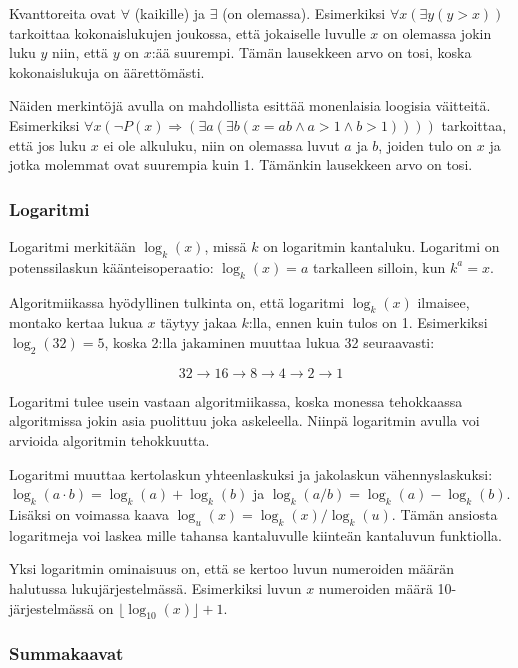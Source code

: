 Kvanttoreita ovat $\forall$ (kaikille) ja $\exists$
(on olemassa).
Esimerkiksi $\forall x (\exists y (y > x))$
tarkoittaa kokonaislukujen joukossa,
että jokaiselle luvulle $x$ on olemassa
jokin luku $y$ niin, että $y$ on $x$:ää suurempi.
Tämän lausekkeen arvo on tosi, koska kokonaislukuja
on äärettömästi.

Näiden merkintöjä avulla on mahdollista esittää
monenlaisia loogisia väitteitä.
Esimerkiksi
$\forall x (\lnot P(x) \Rightarrow (\exists a (\exists b (x = ab \land a > 1 \land b > 1))))$
tarkoittaa, että jos luku $x$ ei ole alkuluku,
niin on olemassa luvut $a$ ja $b$,
joiden tulo on $x$ ja jotka molemmat ovat suurempia kuin 1.
Tämänkin lausekkeen arvo on tosi.

\subsubsection{Logaritmi}


Logaritmi merkitään $\log_k(x)$, missä $k$ on logaritmin kantaluku.
Logaritmi on potenssilaskun käänteisoperaatio:
$\log_k(x)=a$ tarkalleen silloin, kun $k^a=x$.

Algoritmiikassa hyödyllinen tulkinta on,
että logaritmi $\log_k(x)$ ilmaisee, montako kertaa lukua $x$
täytyy jakaa $k$:lla, ennen kuin tulos on 1.
Esimerkiksi $\log_2(32)=5$, koska 2:lla jakaminen
muuttaa lukua 32 seuraavasti:

\[32 \rightarrow 16 \rightarrow 8 \rightarrow 4 \rightarrow 2 \rightarrow 1 \]

Logaritmi tulee usein vastaan algoritmiikassa,
koska monessa tehokkaassa algoritmissa jokin asia puolittuu
joka askeleella.
Niinpä logaritmin avulla voi arvioida algoritmin tehokkuutta.

Logaritmi muuttaa kertolaskun yhteenlaskuksi ja
jakolaskun vähennyslaskuksi:
$\log_k(a \cdot b) = \log_k(a)+\log_k(b)$ ja
$\log_k(a / b) = \log_k(a)-\log_k(b)$.
Lisäksi on voimassa kaava $\log_u(x) = \log_k(x)/\log_k(u)$.
Tämän ansiosta logaritmeja voi laskea mille tahansa kantaluvulle
kiinteän kantaluvun funktiolla.

Yksi logaritmin ominaisuus on, että se kertoo luvun numeroiden
määrän halutussa lukujärjestelmässä.
Esimerkiksi luvun $x$ numeroiden määrä 10-jär\-jes\-tel\-mäs\-sä on
$\lfloor \log_{10}(x)\rfloor + 1$.

\subsubsection{Summakaavat}

